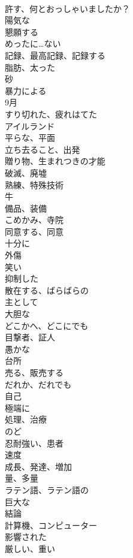 \documentclass[8pt]{extreport}
\begin{document}
\begin{CJK}{UTF8}{min}
\\	許す、何とおっしゃいましたか？	
\\	陽気な	
\\	懇願する	
\\	めったに…ない	
\\	記録、最高記録、記録する	
\\	脂肪、太った	
\\	砂	
\\	暴力による	
\\	9月	
\\	すり切れた、疲れはてた	
\\	アイルランド	
\\	平らな、平面	
\\	立ち去ること、出発	
\\	贈り物、生まれつきの才能	
\\	破滅、廃墟	
\\	熟練、特殊技術	
\\	牛	
\\	備品、装備	
\\	こめかみ、寺院	
\\	同意する、同意	
\\	十分に	
\\	外傷	
\\	笑い	
\\	抑制した	
\\	散在する、ばらばらの	
\\	主として	
\\	大胆な	
\\	どこかへ、どこにでも	
\\	目撃者、証人	
\\	愚かな	
\\	台所	
\\	売る、販売する	
\\	だれか、だれでも	
\\	自己	
\\	極端に	
\\	処理、治療	
\\	のど	
\\	忍耐強い、患者	
\\	速度	
\\	成長、発達、増加	
\\	量、多量	
\\	ラテン語、ラテン語の	
\\	巨大な	
\\	結論	
\\	計算機、コンピューター	
\\	影響された	
\\	厳しい、重い	

\end{CJK}
\end{document}
